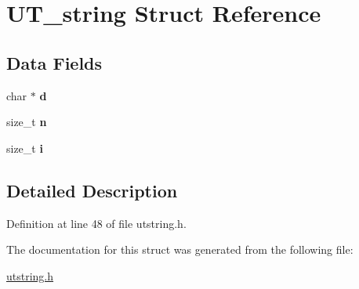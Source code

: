 \hypertarget{struct_u_t__string}{
\section{UT\_\-string Struct Reference}
\label{struct_u_t__string}
}
\subsection*{Data Fields}
\begin{DoxyCompactItemize}
\item 
\hypertarget{struct_u_t__string_ae8062f7fa4067676e9d74ca2b2923ff9}{
char $\ast$ {\bfseries d}}
\label{struct_u_t__string_ae8062f7fa4067676e9d74ca2b2923ff9}

\item 
\hypertarget{struct_u_t__string_a85161591fe87dd4be9cc031e282ffc1f}{
size\_\-t {\bfseries n}}
\label{struct_u_t__string_a85161591fe87dd4be9cc031e282ffc1f}

\item 
\hypertarget{struct_u_t__string_aa78df8b7c6db840e406431e5cb8941be}{
size\_\-t {\bfseries i}}
\label{struct_u_t__string_aa78df8b7c6db840e406431e5cb8941be}

\end{DoxyCompactItemize}


\subsection{Detailed Description}


Definition at line 48 of file utstring.h.



The documentation for this struct was generated from the following file:\begin{DoxyCompactItemize}
\item 
\hyperlink{utstring_8h}{utstring.h}\end{DoxyCompactItemize}
